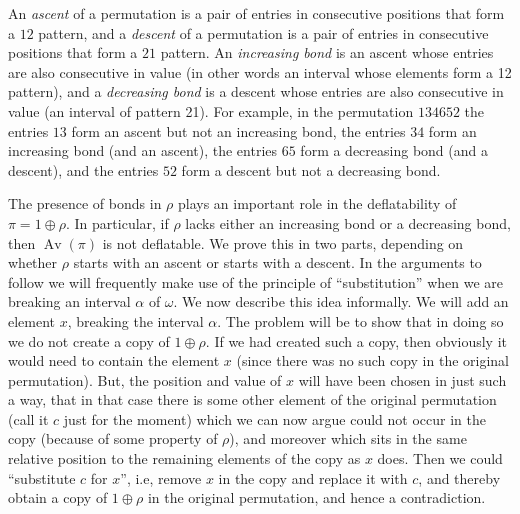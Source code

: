 \documentclass[10pt]{article}
\theoremstyle{plain}
\newcommand{\Av}{\operatorname{Av}}
\begin{document}
An \emph{ascent} of a permutation is a pair of entries in consecutive positions that form a $12$ pattern, and a \emph{descent} of a permutation is a pair of entries in consecutive positions that form a $21$ pattern.  An \emph{increasing bond} is an ascent whose entries are also consecutive in value (in other words an interval whose elements form a 12 pattern), and a \emph{decreasing bond} is a descent whose entries are also consecutive in value (an interval of pattern 21). For example, in the permutation $134652$ the entries $13$ form an ascent but not an increasing bond, the entries $34$ form an increasing bond (and an ascent), the entries $65$ form a decreasing bond (and a descent), and the entries $52$ form a descent but not a decreasing bond.

The presence of bonds in $\rho$ plays an important role in the deflatability of $\pi = 1 \oplus \rho$. In particular, if $\rho$ lacks either an increasing bond or a decreasing bond, then $\Av(\pi)$ is not deflatable. We prove this in two parts, depending on whether $\rho$ starts with an ascent or starts with a descent. In the arguments to follow we will frequently make use of the principle of ``substitution'' when we are breaking an interval $\alpha$ of $\omega$. We now describe this idea informally. We will add an element $x$, breaking the interval $\alpha$. The problem will be to show that in doing so we do not create a copy of $1 \oplus \rho$. If we had created such a copy, then obviously it would need to contain the element $x$ (since there was no such copy in the original permutation). But, the position and value of $x$ will have been chosen in just such a way, that in that case there is some other element of the original permutation (call it $c$ just for the moment) which we can now argue could not occur in the copy (because of some property of $\rho$), and moreover which sits in the same relative position to the remaining elements of the copy as $x$ does. Then we could ``substitute $c$ for $x$'', i.e, remove $x$ in the copy and replace it with $c$, and thereby obtain a copy of $1 \oplus \rho$ in the original permutation, and hence a contradiction.
\end{document}
